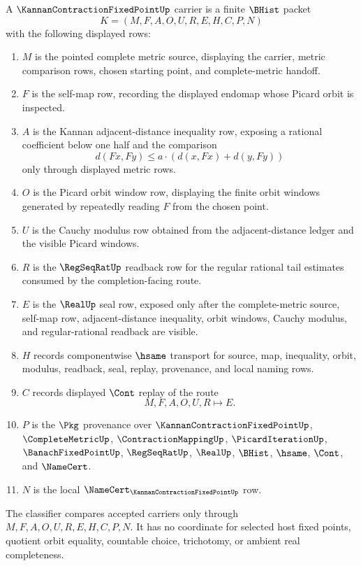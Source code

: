 \begin{definition}
\label{def:kannan-contraction-fixed-point-carrier}
A $\KannanContractionFixedPointUp$ carrier is a finite $\BHist$ packet
$$
K=(M,F,A,O,U,R,E,H,C,P,N)
$$
with the following displayed rows:
\begin{enumerate}
\item $M$ is the pointed complete metric source, displaying the carrier, metric comparison rows, chosen starting point, and complete-metric handoff.
\item $F$ is the self-map row, recording the displayed endomap whose Picard orbit is inspected.
\item $A$ is the Kannan adjacent-distance inequality row, exposing a rational coefficient below one half and the comparison
$$
d(Fx,Fy)\le a\cdot(d(x,Fx)+d(y,Fy))
$$
only through displayed metric rows.
\item $O$ is the Picard orbit window row, displaying the finite orbit windows generated by repeatedly reading $F$ from the chosen point.
\item $U$ is the Cauchy modulus row obtained from the adjacent-distance ledger and the visible Picard windows.
\item $R$ is the $\RegSeqRatUp$ readback row for the regular rational tail estimates consumed by the completion-facing route.
\item $E$ is the $\RealUp$ seal row, exposed only after the complete-metric source, self-map row, adjacent-distance inequality, orbit windows, Cauchy modulus, and regular-rational readback are visible.
\item $H$ records componentwise $\hsame$ transport for source, map, inequality, orbit, modulus, readback, seal, replay, provenance, and local naming rows.
\item $C$ records displayed $\Cont$ replay of the route
$$
M,F,A,O,U,R \longmapsto E .
$$
\item $P$ is the $\Pkg$ provenance over $\KannanContractionFixedPointUp$, $\CompleteMetricUp$, $\ContractionMappingUp$, $\PicardIterationUp$, $\BanachFixedPointUp$, $\RegSeqRatUp$, $\RealUp$, $\BHist$, $\hsame$, $\Cont$, and $\NameCert$.
\item $N$ is the local $\NameCert_{\KannanContractionFixedPointUp}$ row.
\end{enumerate}
The classifier compares accepted carriers only through $M,F,A,O,U,R,E,H,C,P,N$. It has no coordinate for selected host fixed points, quotient orbit equality, countable choice, trichotomy, or ambient real completeness.
\end{definition}

